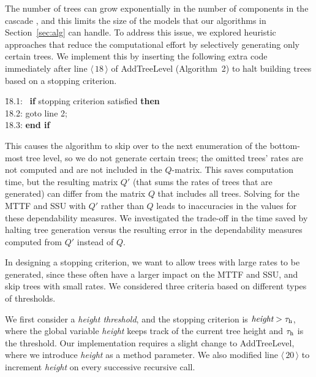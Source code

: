 \documentclass[12pt]{article}
\newcommand{\changed}[1]{#1}
\newcommand{\changed}[1]{\textcolor{red}{#1}}
\newcommand{\varName}[1]{\textrm{\it#1}}
\newcommand{\citeLine}[1]{$\langle \, #1 \, \rangle$}
\begin{document}
The number of trees can grow exponentially in the number of components in the
cascade \cite{ING:2009}, and this limits the size of the
models that our
\changed{algorithms in Section~\ref{sec:alg}}
can handle.
To address this issue, we explored heuristic approaches
that reduce the computational effort by
\changed{selectively generating only
certain trees}.
We implement this by
inserting the following
extra code
immediately after
line \citeLine{18} of
\mbox{AddTreeLevel}
\changed{(Algorithm~2)}
to
halt
\changed{building trees based}
on a stopping criterion.
\begin{tabbing}
\hspace*{1em} \=
{\small 18.1:} \ \=
\textbf{if} stopping criterion satisfied
\textbf{then}
\\
\>
{\small 18.2:}
\> \hspace*{0.5em}
goto line 2;
\\
\>
{\small 18.3:}
\> \textbf{end if}
\end{tabbing}
%
This causes the algorithm to
skip over to the next enumeration of the
bottom-most tree level,
so
we do not generate certain trees;
the omitted trees' rates are not
computed and are not included in the
$Q$-matrix.
This saves computation time,
but the resulting matrix $Q'$ (that
sums the rates of trees that are generated)
can differ from the
matrix $Q$ that
includes all trees. Solving for the MTTF and
SSU with $Q'$ rather than $Q$ leads to inaccuracies in the values for these
dependability measures.  We investigated the trade-off in the time saved by
halting tree generation versus the resulting error in the dependability
measures computed from $Q'$ instead of $Q$.

In designing a stopping criterion,
we want to allow trees with large rates
to be generated,
since these
\changed{often}
have a larger impact on
the MTTF and SSU, and skip trees
with small rates.
We considered three
criteria based on different
types of thresholds.


We first consider a \textit{height threshold},
and the stopping criterion is
$\varName{height} > \changed{\tau_{\textrm h}}$,
where the global variable \varName{height}
keeps track of the current tree height
and $\tau_{\textrm h}$ is the threshold.
Our implementation requires a
slight change to \mbox{AddTreeLevel},
where we introduce \varName{height}
as a method parameter. We also modified line
\citeLine{20} to increment \varName{height}
on every successive recursive call.
\end{document}
